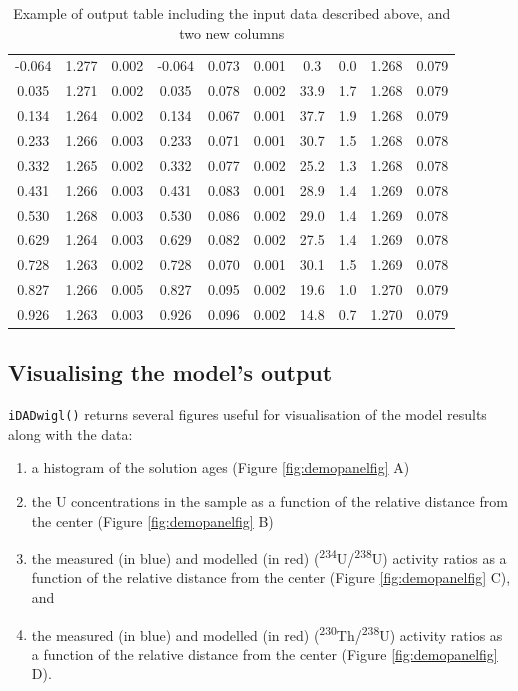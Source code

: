 \documentclass[]{elsarticle} %
\providecommand{\tightlist}{%
  \setlength{\itemsep}{0pt}\setlength{\parskip}{0pt}}
\begin{document}
\begin{table}[ht]
\begin{tabular}{cccccccccc}
  -0.064 & 1.277 & 0.002 & -0.064 & 0.073 & 0.001 & 0.3 & 0.0 & 1.268 & 0.079 \\ 
  0.035 & 1.271 & 0.002 & 0.035 & 0.078 & 0.002 & 33.9 & 1.7 & 1.268 & 0.079 \\ 
  0.134 & 1.264 & 0.002 & 0.134 & 0.067 & 0.001 & 37.7 & 1.9 & 1.268 & 0.079 \\ 
  0.233 & 1.266 & 0.003 & 0.233 & 0.071 & 0.001 & 30.7 & 1.5 & 1.268 & 0.078 \\ 
  0.332 & 1.265 & 0.002 & 0.332 & 0.077 & 0.002 & 25.2 & 1.3 & 1.268 & 0.078 \\ 
  0.431 & 1.266 & 0.003 & 0.431 & 0.083 & 0.001 & 28.9 & 1.4 & 1.269 & 0.078 \\ 
  0.530 & 1.268 & 0.003 & 0.530 & 0.086 & 0.002 & 29.0 & 1.4 & 1.269 & 0.078 \\ 
  0.629 & 1.264 & 0.003 & 0.629 & 0.082 & 0.002 & 27.5 & 1.4 & 1.269 & 0.078 \\ 
  0.728 & 1.263 & 0.002 & 0.728 & 0.070 & 0.001 & 30.1 & 1.5 & 1.269 & 0.078 \\ 
  0.827 & 1.266 & 0.005 & 0.827 & 0.095 & 0.002 & 19.6 & 1.0 & 1.270 & 0.079 \\ 
  0.926 & 1.263 & 0.003 & 0.926 & 0.096 & 0.002 & 14.8 & 0.7 & 1.270 & 0.079 \\ 
   \hline
\end{tabular}
\caption{\label{tab:outputdata}Example of output table including the input data described above, and two new columns} 
\end{table}

\newpage

\hypertarget{visualising-the-models-output}{%
\subsection{Visualising the model's output}\label{visualising-the-models-output}}

\texttt{iDADwigl()} returns several figures useful for visualisation of the model results along with the data:

\begin{enumerate}
\def\labelenumi{\arabic{enumi}.}
\tightlist
\item
  a histogram of the solution ages (Figure \ref{fig:demopanelfig} A)
\item
  the U concentrations in the sample as a function of the relative distance from the center (Figure \ref{fig:demopanelfig} B)
\item
  the measured (in blue) and modelled (in red) (\textsuperscript{234}U/\textsuperscript{238}U) activity ratios as a function of the relative distance from the center (Figure \ref{fig:demopanelfig} C), and
\item
  the measured (in blue) and modelled (in red) (\textsuperscript{230}Th/\textsuperscript{238}U) activity ratios as a function of the relative distance from the center (Figure \ref{fig:demopanelfig} D).
\end{enumerate}
\end{document}
